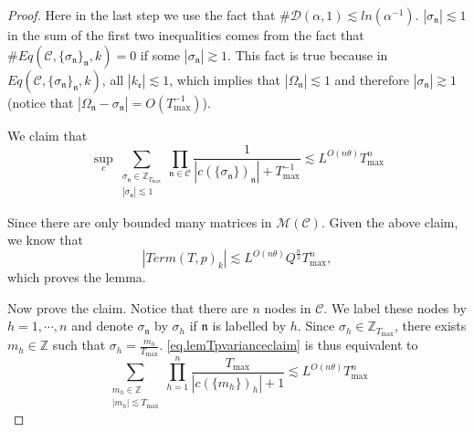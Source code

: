 \begin{proof}
Here in the last step we use the fact that $\#\mathcal{D}(\alpha,1)\lesssim ln(\alpha^{-1})$. $|\sigma_{\mathfrak{n}}|\lesssim 1$ in the sum of the first two inequalities comes from the fact that $\#Eq(\mathcal{C}, \{\sigma_{\mathfrak{n}}\}_{\mathfrak{n}},k)=0$ if some $|\sigma_{\mathfrak{n}}|\gtrsim 1$. This fact is true because in $Eq(\mathcal{C}, \{\sigma_{\mathfrak{n}}\}_{\mathfrak{n}},k)$, all $|k_{\mathfrak{e}}|\lesssim 1$, which implies that $|\Omega_{\mathfrak{n}}|\lesssim 1$ and therefore $|\sigma_{\mathfrak{n}}|\gtrsim 1$ (notice that $|\Omega_{\mathfrak{n}}-\sigma_{\mathfrak{n}}|=O(T^{-1}_{\text{max}})$).

We claim that 
\begin{equation}\label{eq.lemTpvarianceclaim}
     \sup_{c}\sum_{\substack{\sigma_{\mathfrak{n}}\in \mathbb{Z}_{T_{\text{max}}}\\ |\sigma_{\mathfrak{n}}|\lesssim 1}} \prod_{\mathfrak{n}\in \mathcal{C}}\frac{1}{|c(\{\sigma_{\mathfrak{n}}\})_{\mathfrak{n}}|+T^{-1}_{\text{max}}}\lesssim L^{O(n\theta)} T^{n}_{\text{max}}
\end{equation}

Since there are only bounded many matrices in $\mathscr{M}(\mathcal{C})$.  Given the above claim, we know that 
\begin{equation}
    |Term(T, p)_k|\lesssim L^{O(n\theta)} Q^{\frac{n}{2}} T^{n}_{\text{max}},
\end{equation}
which proves the lemma.

Now prove the claim. Notice that there are $n$ nodes in $\mathcal{C}$. We label these nodes by $h=1,\cdots,n$ and denote $\sigma_{\mathfrak{n}}$ by $\sigma_{h}$ if $\mathfrak{n}$ is labelled by $h$. Since $\sigma_{h}\in \mathbb{Z}_{T_{\text{max}}}$, there exists $m_{h}\in \mathbb{Z}$ such that $\sigma_{h}=\frac{m_{h}}{T_{\text{max}}}$. \eqref{eq.lemTpvarianceclaim} is thus equivalent to 
\begin{equation}\label{eq.lemTpvarianceclaim1}
    \sum_{\substack{m_{h}\in \mathbb{Z}\\ |m_{h}|\lesssim  T_{\text{max}}}} \prod_{h=1}^{n}\frac{T_{\text{max}}}{|c(\{m_{h}\})_{h}|+1}\lesssim L^{O(n\theta)}T^{n}_{\text{max}}
\end{equation}


\end{proof}
